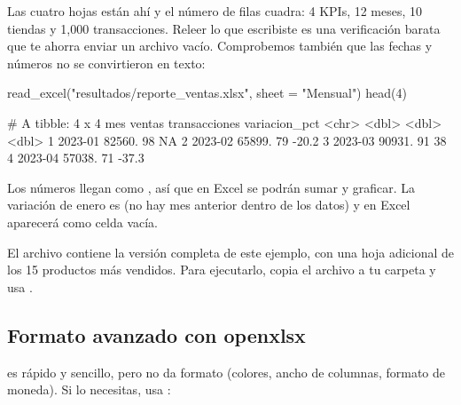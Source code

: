 Las cuatro hojas están ahí y el número de filas cuadra: 4 KPIs, 12 meses, 10
tiendas y 1,000 transacciones. Releer lo que escribiste es una verificación
barata que te ahorra enviar un archivo vacío. Comprobemos también que las
fechas y números no se convirtieron en texto:

\begin{rcode}
read_excel("resultados/reporte_ventas.xlsx", sheet = "Mensual") %
  head(4)
\end{rcode}
\begin{rsalida}
# A tibble: 4 x 4
  mes     ventas transacciones variacion_pct
  <chr>    <dbl>         <dbl>         <dbl>
1 2023-01 82560.            98          NA  
2 2023-02 65899.            79         -20.2
3 2023-03 90931.            91          38  
4 2023-04 57038.            71         -37.3
\end{rsalida}

Los números llegan como , así que en Excel se podrán sumar y
graficar. La variación de enero es  (no hay mes anterior dentro
de los datos) y en Excel aparecerá como celda vacía.

El archivo  contiene la versión
completa de este ejemplo, con una hoja adicional de los 15 productos más
vendidos. Para ejecutarlo, copia el archivo a tu carpeta
 y usa
.

\subsection{Formato avanzado con openxlsx}

 es rápido y sencillo, pero no da formato (colores, ancho
de columnas, formato de moneda). Si lo necesitas, usa :


